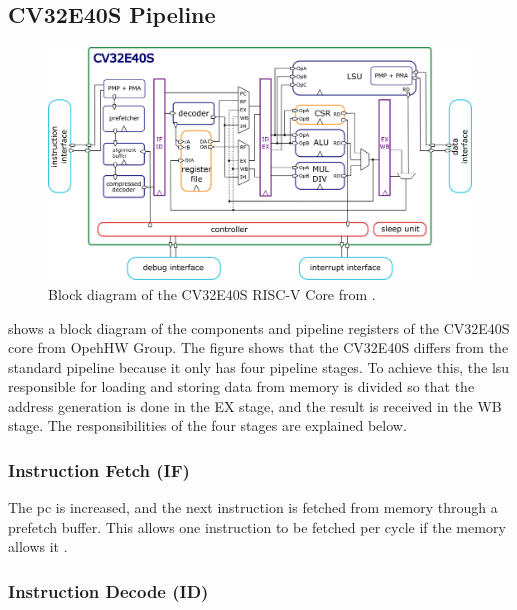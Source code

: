 \subsection{CV32E40S Pipeline}
\label{sec:bg_cv32Pipeline}


\begin{figure}[htb]
    \centering
    \includegraphics[width=\linewidth]{figures/CV32E40S_Block_Diagram.png}
    \caption{Block diagram of the CV32E40S RISC-V Core from \cite{openhwgroupIntroductionCOREVCV32E40S2023}.}
    \label{fig:cv32e40s-block}
\end{figure}

 shows a block diagram of the components and pipeline registers of the CV32E40S core from OpehHW Group.
The figure shows that the CV32E40S differs from the standard pipeline because it only has four pipeline stages. To achieve this, the \acrlong{lsu} responsible for loading and storing data from memory is divided so that the address generation is done in the EX stage, and the result is received in the WB stage.
The responsibilities of the four stages are explained below.

\subsubsection{Instruction Fetch (IF)}

The \acrfull{pc} is increased, and the next instruction is fetched from memory through a prefetch buffer. This allows one instruction to be fetched per cycle if the memory allows it \cite{openhwgroupPipelineDetailsCOREV2023}.

\subsubsection{Instruction Decode (ID)}

